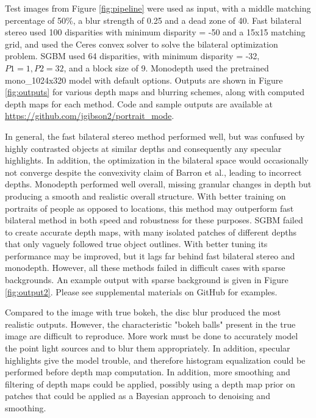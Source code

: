 \documentclass[10pt,twocolumn,letterpaper]{article}
\begin{document}
\par Test images from Figure \ref{fig:pipeline} were used as input, with a middle matching percentage of 50\%, a blur strength of 0.25 and a dead zone of 40. Fast bilateral stereo used 100 disparities with minimum disparity = -50 and a 15x15
matching grid, and used the Ceres convex solver to solve the bilateral optimization problem. SGBM used 64 disparities, with minimum disparity = -32, $P1 = 1, P2 = 32$, and a block size of 9. Monodepth used the pretrained mono\_1024x320 model with default options.
Outputs are shown in Figure \ref{fig:outputs} for various depth maps and blurring schemes, along with computed depth maps for each method.
Code and sample outputs are available at \url{https://github.com/jgibson2/portrait_mode}.

\par In general, the fast bilateral stereo method performed well, but was confused by highly contrasted objects at similar depths and consequently any specular highlights.
In addition, the optimization in the bilateral space would occasionally not converge despite the convexivity claim of Barron et al., leading to incorrect depths.
Monodepth performed well overall, missing granular changes in depth but producing a smooth and realistic overall structure. With better training on portraits of people
as opposed to locations, this method may outperform fast bilateral method in both speed and robustness for these purposes. SGBM failed to create accurate depth maps,
with many isolated patches of different depths that only vaguely followed true object outlines. With better tuning its performance may be improved, but it lags far
behind fast bilateral stereo and monodepth. However, all these methods failed in difficult cases with sparse backgrounds. An example output with sparse background is given
in Figure \ref{fig:output2}. Please see supplemental materials on GitHub for examples.

\par Compared to the image with true bokeh, the disc blur produced the most realistic outputs. However, the characteristic "bokeh balls" present in the true image are
difficult to reproduce. More work must be done to accurately model the point light sources and to blur them appropriately. In addition, specular highlights give the model
trouble, and therefore histogram equalization could be performed before depth map computation. In addition, more smoothing and filtering of depth maps could be applied,
possibly using a depth map prior on patches that could be applied as a Bayesian approach to denoising and smoothing.
\end{document}
